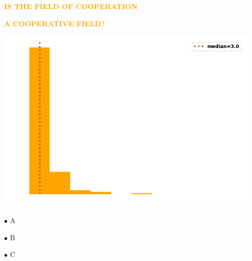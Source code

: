 \documentclass[usenames,dvipsnames,t]{beamer}
\begin{document}
\begin{columns}
\begin{column}{.33\linewidth}
    \begin{center}
        
    \end{center}

    \vspace{1cm}
\end{column}
\vrule width 3pt
\begin{column}{.33\linewidth}
    \begin{center}
        \textbf{\Large\textcolor{orange}{\textsc{IS THE FIELD OF COOPERATION}}}
        \vspace{.5cm}
    
        \textbf{\Large\textcolor{orange}{\textsc{A COOPERATIVE FIELD?}}}
    \end{center}
    \vspace{1.5cm}


    \begin{center}
        \includegraphics[width=.6\textwidth]{static/degree_dist.png}
        \vspace{1cm}

        \small{
            $\bullet$ A
            \vspace{.2cm}

            $\bullet$ B
            \vspace{.2cm}
            
            $\bullet$ C}
    \end{center}


\end{column}
\end{columns}
\end{document}
